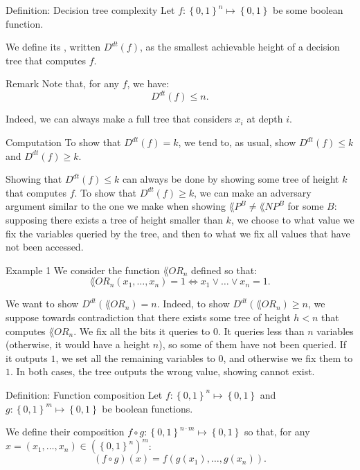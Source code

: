 \documentclass[a4paper]{article}
\begin{document}
\begin{parag}{Definition: Decision tree complexity}
    Let $f: \left\{0, 1\right\}^n \mapsto \left\{0, 1\right\}$ be some boolean function.

    We define its , written $D^{dt}\left(f\right)$, as the smallest achievable height of a decision tree that computes $f$.

    \begin{subparag}{Remark}
        Note that, for any $f$, we have: 
        \[D^{dt}\left(f\right) \leq n.\]

        Indeed, we can always make a full tree that considers $x_i$ at depth $i$.
    \end{subparag}
    
    \begin{subparag}{Computation}
        To show that $D^{dt}\left(f\right) = k$, we tend to, as usual, show $D^{dt}\left(f\right) \leq k$ and $D^{dt}\left(f\right) \geq k$.

        Showing that $D^{dt}\left(f\right) \leq k$ can always be done by showing some tree of height $k$ that computes $f$. To show that $D^{dt}\left(f\right) \geq k$, we can make an adversary argument similar to the one we make when showing $\lang{P}^B \neq \lang{NP}^B$ for some $B$: supposing there exists a tree of height smaller than $k$, we choose to what value we fix the variables queried by the tree, and then to what we fix all values that have not been accessed.
    \end{subparag}
\end{parag}

\begin{parag}{Example 1}
    We consider the function $\lang{OR}_n$ defined so that: 
    \[\lang{OR}_n\left(x_1, \ldots, x_n\right) = 1 \iff x_1 \lor \ldots \lor x_n = 1.\]
    
    We want to show $D^{dt}\left(\lang{OR}_n\right) = n$. Indeed, to show $D^{dt}\left(\lang{OR}_n\right) \geq n$, we suppose towards contradiction that there exists some tree of height $h < n$ that computes $\lang{OR}_n$. We fix all the bits it queries to $0$. It queries less than $n$ variables (otherwise, it would have a height $n$), so some of them have not been queried. If it outputs $1$, we set all the remaining variables to $0$, and otherwise we fix them to $1$. In both cases, the tree outputs the wrong value, showing cannot exist.
\end{parag}

\begin{parag}{Definition: Function composition}
    Let $f: \left\{0, 1\right\}^n \mapsto \left\{0, 1\right\}$ and $g: \left\{0, 1\right\}^m \mapsto \left\{0, 1\right\}$ be boolean functions.

    We define their composition $f\circ g: \left\{0, 1\right\}^{n\cdot m} \mapsto \left\{0, 1\right\}$ so that, for any $x = \left(x_1, \ldots, x_n\right) \in \left(\left\{0, 1\right\}^n\right)^m$: 
    \[\left(f \circ g\right)\left(x\right) = f\left(g\left(x_1\right), \ldots, g\left(x_n\right)\right).\]
\end{parag}
\end{document}

